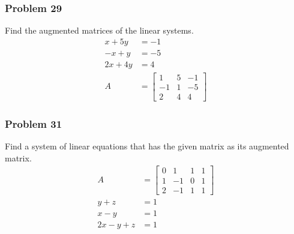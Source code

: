 \documentclass[letterpaper, 12pt]{math}
\begin{document}
\subsubsection*{Problem 29}
Find the augmented matrices of the linear systems.
\begin{align*}
  x+5y &= -1 \\
  -x+y &= -5 \\
  2x+4y &= 4 \\
  A &= \left[\begin{array}{cc|c}
    1 & 5 & -1 \\
    -1 & 1 & -5 \\
    2 & 4 & 4
  \end{array}\right]
\end{align*}

\subsubsection*{Problem 31}
Find a system of linear equations that has the given matrix as its augmented
matrix.
\begin{align*}
  A &= \left[\begin{array}{ccc|c}
    0 & 1 & 1 & 1 \\
    1 & -1 & 0 & 1 \\
    2 & -1 & 1 & 1
  \end{array}\right] \\
  y+z &= 1 \\
  x-y &= 1 \\
  2x-y+z &= 1
\end{align*}
\end{document}
